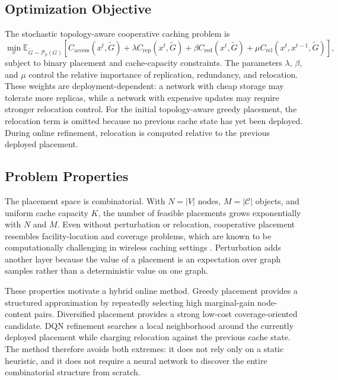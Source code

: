\subsection{Optimization Objective}

The stochastic topology-aware cooperative caching problem is
\[
\min_x
\mathbb{E}_{\tilde{G}\sim\mathcal{P}_p(G)}
\left[
C_{\text{access}}(x^t,\tilde{G})
+ \lambda C_{\text{rep}}(x^t,\tilde{G})
+ \beta C_{\text{red}}(x^t,\tilde{G})
+ \mu C_{\text{rel}}(x^t,x^{t-1},\tilde{G})
\right],
\]
subject to binary placement and cache-capacity constraints. The parameters \(\lambda\), \(\beta\), and \(\mu\) control the relative importance of replication, redundancy, and relocation. These weights are deployment-dependent: a network with cheap storage may tolerate more replicas, while a network with expensive updates may require stronger relocation control. For the initial topology-aware greedy placement, the relocation term is omitted because no previous cache state has yet been deployed. During online refinement, relocation is computed relative to the previous deployed placement.

\subsection{Problem Properties}

The placement space is combinatorial. With \(N=|V|\) nodes, \(M=|\mathcal{C}|\) objects, and uniform cache capacity \(K\), the number of feasible placements grows exponentially with \(N\) and \(M\). Even without perturbation or relocation, cooperative placement resembles facility-location and coverage problems, which are known to be computationally challenging in wireless caching settings \cite{Poularakis2014Approx}. Perturbation adds another layer because the value of a placement is an expectation over graph samples rather than a deterministic value on one graph.

These properties motivate a hybrid online method. Greedy placement provides a structured approximation by repeatedly selecting high marginal-gain node-content pairs. Diversified placement provides a strong low-cost coverage-oriented candidate. DQN refinement searches a local neighborhood around the currently deployed placement while charging relocation against the previous cache state. The method therefore avoids both extremes: it does not rely only on a static heuristic, and it does not require a neural network to discover the entire combinatorial structure from scratch.

